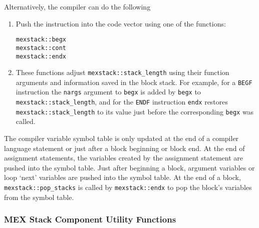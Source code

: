 \documentclass[12pt]{article}
\begin{document}
Alternatively, the compiler can do the following

\begin{enumerate}
\item Push the instruction into the code vector using one of the
functions:
\begin{indpar}[1in]
{\tt mexstack::begx} \\
{\tt mexstack::cont} \\
{\tt mexstack::endx}
\end{indpar}
\item These functions adjust {\tt mexstack::stack\_length} using
their function arguments and information saved in the
block stack.  For example, for a {\tt BEGF}
instruction the {\tt nargs} argument to {\tt begx} is added by
{\tt begx} to {\tt mexstack::stack\_length}, and for the {\tt ENDF}
instruction {\tt endx} restores {\tt mexstack::stack\_length}
to its value just before the corresponding {\tt begx} was called.

\end{enumerate}

The compiler variable symbol table is only updated at the end of
a compiler language statement or just after a block beginning or block end.
At the end of assignment
statements, the variables created by the assignment statement are
pushed into the symbol table.  Just after beginning a block,
argument variables or loop `next' variables are pushed into the symbol table.
At the end of a block,
{\tt mexstack::pop\_stacks} is called by {\tt mexstack::endx}
to pop the block's variables from the symbol table.

\subsubsection{MEX Stack Component Utility Functions}
\label{MEX-STACK-COMPONENT-UTILITY-FUNCTIONS}
\end{document}
